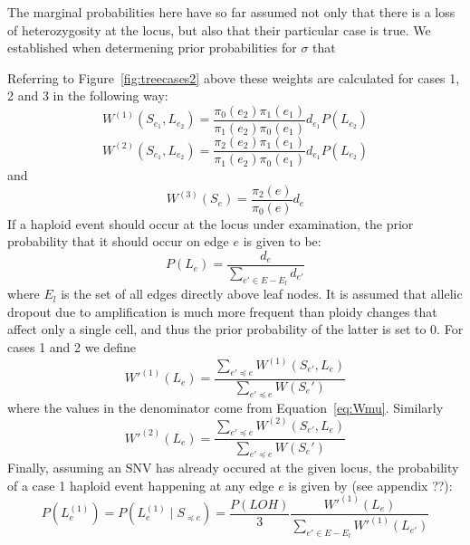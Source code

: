 \documentclass[../../main.tex]{subfiles}
\begin{document}
The marginal probabilities here have so far assumed not only that there is a loss of heterozygosity at the locus, but also that their particular case is true.
We established when determening prior probabilities for $\sigma$ that 

\newpage
Referring to Figure~\ref{fig:treecases2} above these weights are calculated for cases 1, 2 and 3 in the following way:
\begin{equation*}
W^{(1)}(S_{e_1},L_{e_2}) = \frac{\pi_0(e_2)\pi_1(e_1)}{\pi_1(e_2)\pi_0(e_1)}d_{e_1}P(L_{e_2})
\end{equation*}
\begin{equation*}
W^{(2)}(S_{e_1},L_{e_2}) = \frac{\pi_2(e_2)\pi_1(e_1)}{\pi_1(e_2)\pi_0(e_1)}d_{e_1}P(L_{e_2})
\end{equation*}
and
\begin{equation*}
W^{(3)}(S_e) = \frac{\pi_2(e)}{\pi_0(e)}d_e
\end{equation*} 
If a haploid event should occur at the locus under examination, the prior probability that it should occur on edge $e$ is given to be: %
\begin{equation*}
P(L_e) = \frac{d_e}{\sum_{e'\in E-E_l} d_{e'}}
\end{equation*}
where $E_l$ is the set of all edges directly above leaf nodes. It is assumed that allelic dropout due to amplification is much more frequent than ploidy changes that affect only a single cell, and thus the prior probability of the latter is set to 0. For cases 1 and 2 we define
\begin{equation*}
W'^{(1)}(L_e) = \frac{\sum_{e' \preceq e} W^{(1)}(S_{e'},L_e)}{\sum_{e' \preceq e}W(S_e')} 
\end{equation*}
where the values in the denominator come from Equation~\eqref{eq:Wmu}. Similarly
\begin{equation*}
W'^{(2)}(L_e) = \frac{\sum_{e' \preceq e} W^{(2)}(S_{e'},L_e)}{\sum_{e' \preceq e}W(S_e')} 
\end{equation*}
Finally, assuming an SNV has already occured at the given locus, the probability of a case 1 haploid event happening at any edge $e$ is given by (see appendix ??):
\begin{equation*}
P(L_e^{(1)}) = P(L_e^{(1)}\mid S_{\preceq e}) = \frac{P(LOH)}{3} \frac{W'^{(1)}(L_e)}{\sum_{e'\in E-E_l}W'^{(1)}(L_{e'})}
\end{equation*}
\end{document}
